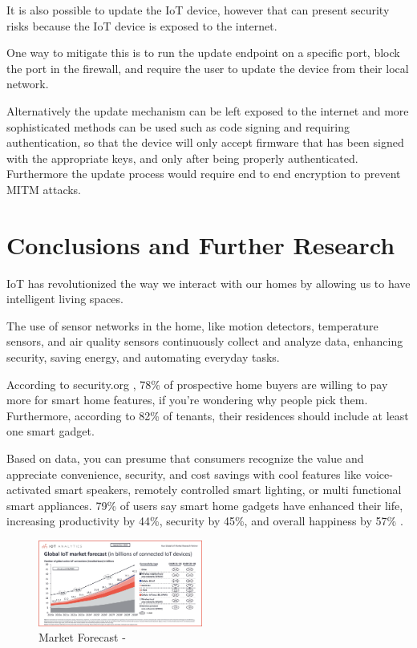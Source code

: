 \documentclass[10pt, journal]{IEEEtran} %
\begin{document}
It is also possible to update the IoT device, however that can present security risks
because the IoT device is exposed to the internet.

One way to mitigate this is to run the update endpoint on a specific port,
block the port in the firewall,
and require the user to update the device from their local network.

Alternatively the update mechanism can be left exposed to the internet
and more sophisticated methods can be used such as code signing and requiring authentication,
so that the device will only accept firmware that has been signed with the appropriate keys,
and only after being properly authenticated.
Furthermore the update process would require end to end encryption to prevent MITM attacks.


\section{Conclusions and Further Research}


IoT has revolutionized the way we interact with our homes 
by allowing us to have intelligent living spaces.

The use of sensor networks in the home, like motion detectors, temperature sensors, 
and air quality sensors continuously collect and analyze data,
enhancing security, saving energy, and automating everyday tasks.

According to security.org \cite[Vigderman]{Vigderman}, 78\% of prospective home buyers are willing to pay more for smart home features, 
if you're wondering why people pick them.
Furthermore, according to 82\% of tenants, their residences should include at least one smart gadget\cite[Howell]{Howell}.

Based on data, you can presume that consumers recognize the value and appreciate convenience, security, 
and cost savings with cool features like voice-activated smart speakers, remotely controlled smart lighting, 
or multi functional smart appliances. 79\% of users say smart home gadgets have enhanced their life, 
increasing productivity by 44\%, security by 45\%, and overall happiness by 57\% \cite[Howarth]{Howarth}.


\begin{figure}[htbp]
    \centering
    \includegraphics[width=0.48\textwidth]{images/forecast.png}
    \caption{Market Forecast - \cite[Sinha]{Sinha}}
    \label{fig:forecast}
\end{figure}
\end{document}
